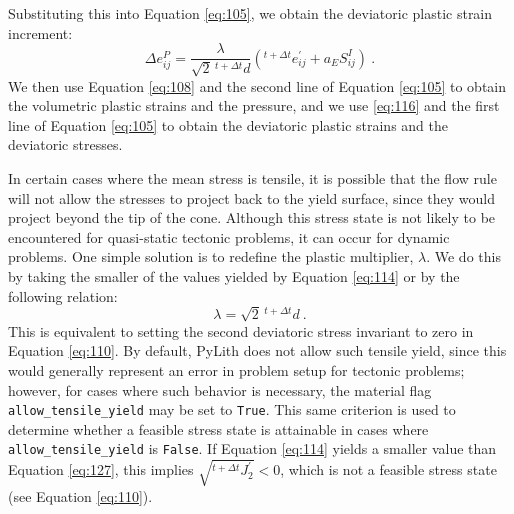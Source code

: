 Substituting this into Equation \ref{eq:105}, we obtain the deviatoric
plastic strain increment:
\begin{equation}
\Delta e_{ij}^{P}=\frac{\lambda}{\sqrt{2}\,\phantom{}^{t+\Delta t}d}\left(^{t+\Delta t}e_{ij}^{\prime}+a_{E}S_{ij}^{I}\right)\:.\label{eq:116}
\end{equation}
We then use Equation \ref{eq:108} and the second line of Equation
\ref{eq:105} to obtain the volumetric plastic strains and the pressure,
and we use \ref{eq:116} and the first line of Equation \ref{eq:105}
to obtain the deviatoric plastic strains and the deviatoric stresses.

In certain cases where the mean stress is tensile, it is possible
that the flow rule will not allow the stresses to project back to
the yield surface, since they would project beyond the tip of the
cone. Although this stress state is not likely to be encountered for
quasi-static tectonic problems, it can occur for dynamic problems.
One simple solution is to redefine the plastic multiplier, $\lambda$.
We do this by taking the smaller of the values yielded by Equation
\ref{eq:114} or by the following relation:
\begin{equation}
\lambda=\sqrt{2}\,\phantom{}^{t+\Delta t}d\:.\label{eq:127}
\end{equation}
This is equivalent to setting the second deviatoric stress invariant
to zero in Equation \ref{eq:110}. By default, PyLith does not allow
such tensile yield, since this would generally represent an error
in problem setup for tectonic problems; however, for cases where such
behavior is necessary, the material flag \texttt{allow\_tensile\_yield}
may be set to \texttt{True}. This same criterion is used to determine
whether a feasible stress state is attainable in cases where \texttt{allow\_tensile\_yield}
is \texttt{False}. If Equation \ref{eq:114} yields a smaller value
than Equation \ref{eq:127}, this implies $\sqrt{^{t+\Delta t}J_{2}^{\prime}}<0$,
which is not a feasible stress state (see Equation \ref{eq:110}).


